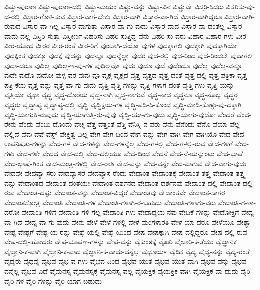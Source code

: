 {ವಿಷ್ಣು-ಪುರಾಣ
ವಿಷ್ಣು-ಪುರಾಣ-ದಲ್ಲಿ
ವಿಷ್ಣು-ಮಯಂ
ವಿಷ್ಣು-ವನ್ನು
ವಿಷ್ಣು-ವಿನ
ವಿಷ್ಣುವೇ
ವಿಸ್ತರಿ-ಸಿದರು
ವಿಸ್ತರಿಸು-ವು-ದ-ರಲ್ಲಿ
ವಿಸ್ತಾರ-ಗೊಳಿ-ಸುವ
ವಿಸ್ತಾರ-ವಾಗ-ಬೇಕು
ವಿಸ್ತಾರ-ವಾಗಿ
ವಿಸ್ತಾರ-ವಾ-ಗಿದೆ
ವಿಸ್ತಾರ-ವಾಗಿದ್ದರೂ
ವಿಸ್ತಾರ-ವಾಗಿ-ರುವುದ
ವಿಸ್ತಾರ-ವಾ-ಗಿಲ್ಲ
ವಿಸ್ತಾರ-ವಾಗುತ್ತಾ
ವಿಸ್ತಾರ-ವಾ-ಗು-ವುದು
ವಿಸ್ತಾರ-ವಾದ
ವಿಸ್ತಾರ-ವಾ-ದಂತೆಲ್ಲ
ವಿಸ್ತಾರ-ವಾದು-ದಲ್ಲ
ವಿಸ್ತಿರಿ-ಸುತ್ತಾ
ವಿಸ್ತೀರ್ಣ
ವಿಹರಿಸು
ವಿಹರಿ-ಸುತ್ತಿದ್ದ-ವನು
ವಿಹರಿ-ಸು-ವರು
ವಿಹಾರ
ವಿಹಾರ-ಗಳು
ವೀರ
ವೀರ-ಯೋಧ
ವೀರರ
ವೀರ-ರಂತೆ
ವೀರ-ರಿಗೆ
ವುಂಟಾಗಿ-ದೆಯೋ
ವುಗಳ
ವುದಕ್ಕಾಗಲಿ
ವುದಕ್ಕಾಗಿ
ವುದಕ್ಕಾಗಿಯೇ
ವುದಕ್ಕಿಂತ
ವುದಕ್ಕೂ
ವುದಕ್ಕೆ
ವುದನ್ನು
ವುದನ್ನೂ
ವುದನ್ನೆಲ್ಲಾ
ವುದರ
ವುದ-ರಲ್ಲಿ
ವುದ-ರಿಂದ
ವುದ-ರಿಂದಲೇ
ವುದಾಗಲಿ
ವುದಾ-ದರೂ
ವುದಿಲ್ಲ
ವುದಿಲ್ಲ-ಇ-ವು-ಗಳ
ವುದಿಲ್ಲವೋ
ವುದು
ವುದೂ
ವುದೆ
ವುದೆಂದೂ
ವುದೆಲ್ಲ
ವುದೆಲ್ಲ-ವನ್ನೂ
ವುದೇ
ವುದೊ
ವುದೋ
ವುಳ್ಳ-ವರ
ವುವು
ವೂ
ವೃಕ್ಷ
ವೃಕ್ಷದ
ವೃತ್ತ
ವೃತ್ತದ
ವೃತ್ತ-ದಂತೆ
ವೃತ್ತ-ದಲ್ಲಿ
ವೃತ್ತ-ಪತ್ರಿಕಾ
ವೃತ್ತ-ಪತ್ರಿ-ಕೆಯ
ವೃತ್ತ-ವನ್ನು
ವೃತ್ತ-ವಾ-ಗು-ವುದು
ವೃತ್ತಿ
ವೃತ್ತಿ-ಗಳನ್ನು
ವೃತ್ತಿ-ಗಳಾಗ-ದಂತೆ
ವೃತ್ತಿ-ಗಳು
ವೃತ್ತಿ-ಯನ್ನು
ವೃತ್ತಿಯೇ
ವೃಥಾ
ವೃದ್ಧ
ವೃದ್ಧ-ದೊರೆಯ
ವೃದ್ಧ-ನಾಗಿ
ವೃದ್ಧ-ನಾಗುವೆ
ವೃದ್ಧ-ನಾದ
ವೃದ್ಧನೂ
ವೃದ್ಧ-ನೊಬ್ಬ
ವೃದ್ಧರ
ವೃದ್ಧರು
ವೃದ್ಧಾಪ್ಯ
ವೃದ್ಧಾಪ್ಯ-ದಲ್ಲಿ
ವೃದ್ಧಿ
ವೃದ್ಧಿಕ್ಷಯ-ಗಳ
ವೃದ್ಧಿ-ಪಡಿ-ಸಿ-ಕೊಂಡ
ವೃದ್ಧಿ-ಮಾಡಿ-ಕೊಳ್ಳು-ವು-ದಕ್ಕಾಗಿ
ವೃದ್ಧಿ-ಯಾಗುತ್ತಿ-ರುವುದು
ವೃದ್ಧಿ-ಯಾಗುತ್ತಿ-ರು-ವುವು
ವೃದ್ಧಿ-ಯಾ-ಗು-ವುದು
ವೃದ್ಧಿ-ಯಾಗು-ವುದೋ
ವೆಂದರೆ
ವೆಂದ-ರೇನು
ವೆಂದು
ವೆಂಬು-ದೊಂದು
ವೆಚ್ಚ
ವೆತ್ತ
ವೆತ್ತಂತೆ
ವೆತ್ತಿ
ವೆನಿಸ್ಸಿ-ನ-ವರು
ವೆನು
ವೆನೆಂದು
ವೆನೊ
ವೆಯಾ
ವೆಲ್ಲ
ವೆಲ್ಲಿದೆ
ವೆವು
ವೆವೆ
ವೆಸ್ಟ್
ವೇಕ್ತ್ತಿತ್ವ-ವಿಲ್ಲ
ವೇಗ
ವೇಗ-ದಿಂದ
ವೇಗ-ವನ್ನು
ವೇಗ-ವಾಗಿ
ವೇಗ-ವಾಗಿಯೊ
ವೇದ
ವೇದ-ಉಪನಿಷತು-ಗಳನ್ನು
ವೇದ-ಗಳ
ವೇದ-ಗಳನ್ನು
ವೇದ-ಗಳನ್ನೆಲ್ಲ
ವೇದ-ಗಳಲ್ಲಿ
ವೇದ-ಗಳಲ್ಲಿ-ರುವ
ವೇದ-ಗಳಿಗೆ
ವೇದ-ಗಳು
ವೇದ-ಗಳೇ
ವೇದದ
ವೇದ-ದಲ್ಲಿ
ವೇದ-ದಲ್ಲಿಯೂ
ವೇದ-ದಿಂದ
ವೇದನೆ
ವೇದ-ನೆ-ಯನ್ನುಂಟು
ವೇದ-ಭಾಷೆ
ವೇದ-ಭಾಷೆ-ಗಿಂತ
ವೇದ-ಮಂತ್ರ-ಗಳಲ್ಲಿ
ವೇದ-ರಾಶಿ
ವೇದ-ವನ್ನು
ವೇದ-ವನ್ನೇ
ವೇದ-ವಾಗುವ
ವೇದ-ವಾಗು-ವುದು
ವೇದವೇ
ವೇದವ್ಯಾ-ಸರು
ವೇದವ್ಯಾಸರೆ
ವೇದವ್ಯಾಸ-ರೆಂದು
ವೇದಾಂತ
ವೇದಾಂತಕ್ಕೆ
ವೇದಾಂತ-ತತ್ತ್ವ
ವೇದಾಂತ-ತತ್ತ್ವ-ವನ್ನು
ವೇದಾಂತದ
ವೇದಾಂತ-ದಂತೆಯೇ
ವೇದಾಂತ-ದರ್ಶನದ
ವೇದಾಂತ-ದರ್ಶನವು
ವೇದಾಂತ-ದಲ್ಲಿ
ವೇದಾಂತ-ದಲ್ಲಿ-ರುವ
ವೇದಾಂತ-ದಷ್ಟು
ವೇದಾಂತ-ವನ್ನು
ವೇದಾಂತ-ವಿದ್ದರೆ
ವೇದಾಂತವು
ವೇದಾಂತವೇ
ವೇದಾಂತ-ಸಾಗರ
ವೇದಾಂತಸ್ತೋತ್ರ
ವೇದಾಂತಿ
ವೇದಾಂತಿ-ಗಳ
ವೇದಾಂತಿ-ಗಳಾಗಿ-ರ-ಬಹುದು
ವೇದಾಂತಿ-ಗಳಾಗು-ವರು
ವೇದಾಂತಿ-ಗ-ಳಾ-ದರೋ
ವೇದಾಂತಿ-ಗಳಿಗೆ
ವೇದಾಂತಿ-ಗಳಿ-ಗೆಲ್ಲ
ವೇದಾಂತಿ-ಗಳು
ವೇದಾಧ್ಯಯ-ನವು
ವೇದಿಕೆ-ಗಳನ್ನು
ವೇದೋಕ್ತಿಗೆ
ವೇದ್ಯ-ವಾ-ಗಿದೆ
ವೇದ್ಯ-ವಾ-ಗು-ವುದು
ವೇನು
ವೇಳೆ
ವೇಳೆ-ಗಳಲ್ಲಿ
ವೇಳೆ-ಮಂಗಳಾರತಿ
ವೇಳೆ-ಯಾ-ದರೂ
ವೇಳೆಯೂ
ವೇಶ್ಯಾ
ವೇಶ್ಯೆ
ವೇಶ್ಯೆಗೆ
ವೇಶ್ಯೆ-ಯ-ರನ್ನು
ವೇಶ್ಯೆ-ಯಲ್ಲಿ
ವೇಶ್ಯೆ-ಯಿಂದ
ವೇಷ
ವೇಷಕ್ಕಾಗಿ
ವೇಷ-ದಲ್ಲಿದ್ದರೂ
ವೇಷ-ದಲ್ಲಿ-ರುವ
ವೇಷ-ದಲ್ಲಿ-ಹೋದರು
ವೇಷ-ಭೂಷಣ-ಗಳನ್ನು
ವೇಷ-ವನ್ನು
ವೈಕುಂಠಕ್ಕೆ
ವೈಖರಿ
ವೈಚಾರಿ-ಕ-ತೆಯು
ವೈಜ್ಞಾನಿಕ
ವೈಜ್ಞಾನಿ-ಕ-ವಾಗಿ
ವೈಜ್ಞಾನಿ-ಕ-ವಾದ
ವೈಜ್ಞಾನಿ-ಕ-ವಾದು-ದನ್ನೆಲ್ಲ
ವೈಢೂರ್ಯ
ವೈದಿಕ
ವೈದ್ಯ
ವೈದ್ಯ-ನನ್ನು
ವೈದ್ಯ-ರಂತೆ
ವೈದ್ಯರು
ವೈಧವ್ಯ
ವೈಭವ
ವೈಭ-ವ-ಗಳು
ವೈಭವ-ದಿಂದ
ವೈಭವ-ಯುತ
ವೈಭವ-ಯುತ-ವಾಗಿ
ವೈಭವ-ವನ್ನು
ವೈಭವ-ವನ್ನೆಲ್ಲ
ವೈಭವ-ವಿದೆ
ವೈಮನಸ್ಯ
ವೈಮನಸ್ಯಕ್ಕೆ
ವೈಮನಸ್ಯ-ವಲ್ಲ
ವೈಯಕ್ತಿಕ
ವೈಯಕ್ತಿಕ-ವಾಗಿ
ವೈಯಕ್ತಿಕ-ವಾ-ದುದು
ವೈರಿ
ವೈರಿ-ಗಳ
ವೈರಿ-ಗಳನ್ನು
ವೈರಿ-ಯಾಗ-ಬಹುದು
}

